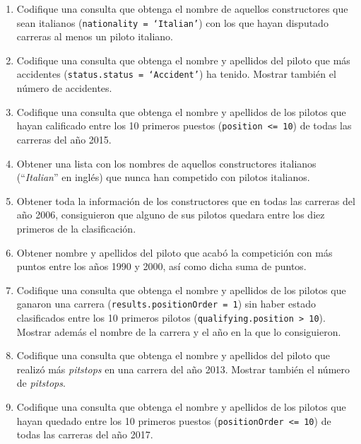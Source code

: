 \documentclass{db-practice}
\begin{document}
\begin{enumerate}
    \item Codifique una consulta que obtenga el nombre de aquellos constructores que sean italianos (\texttt{nationality = `Italian'}) con los que hayan disputado carreras al menos un piloto italiano.
            
    \item Codifique una consulta que obtenga el nombre y apellidos del piloto que más accidentes (\texttt{status.status = `Accident'}) ha tenido. Mostrar también el número de accidentes.
            
    \item Codifique una consulta que obtenga el nombre y apellidos de los pilotos que hayan calificado entre los 10 primeros puestos (\texttt{position <= 10}) de todas las carreras del año 2015.
    
    \item Obtener una lista con los nombres de aquellos constructores italianos (``\textit{Italian}'' en inglés) que nunca han competido con pilotos italianos.
    
    \item Obtener toda la información de los constructores que en todas las carreras del año 2006, consiguieron que alguno de sus pilotos quedara entre los diez primeros de la clasificación.
    
    \item Obtener nombre y apellidos del piloto que acabó la competición con más puntos entre los años 1990 y 2000, así como dicha suma de puntos.

    \item Codifique una consulta que obtenga el nombre y apellidos de los pilotos que ganaron una carrera (\texttt{results.positionOrder = 1}) sin haber estado clasificados entre los 10 primeros pilotos (\texttt{qualifying.position > 10}). Mostrar además el nombre de la carrera y el año en la que lo consiguieron.

    \item Codifique una consulta que obtenga el nombre y apellidos del piloto que realizó más \emph{pitstops} en una carrera del año 2013. Mostrar también el número de \emph{pitstops}.
    
    \item Codifique una consulta que obtenga el nombre y apellidos de los pilotos que hayan quedado entre los 10 primeros puestos (\texttt{positionOrder <= 10}) de todas las carreras del año 2017.
\end{enumerate}
\end{document}
